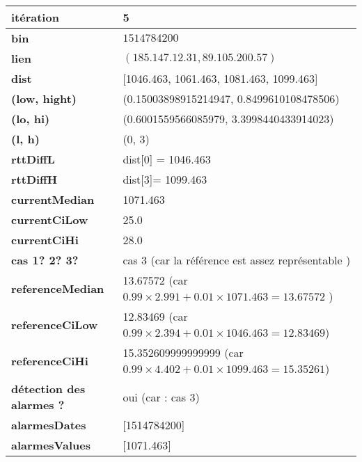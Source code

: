 	\begin{table}[H]
	\centering
	
	\begin{tabularx}{\linewidth}{|l|X| }
		\hline
		\textbf{itération} & 5	\\ \hline
		\textbf{bin} & $1514784200$ \\ \hline
		\textbf{lien} & $(185.147.12.31, 89.105.200.57)$  \\ \hline
		\textbf{dist}& [1046.463, 1061.463, 1081.463, 1099.463]	\\ \hline
		\textbf{(low, hight)}& (0.15003898915214947, 0.8499610108478506) 	\\ \hline
		\textbf{(lo, hi)}&(0.6001559566085979, 3.3998440433914023)  \\ \hline
		\textbf{(l, h)} & (0, 3) 	\\ \hline
		\textbf{rttDiffL}& dist[0] = 1046.463	\\ \hline
		\textbf{rttDiffH}& dist[3]= 1099.463	\\ \hline
		\textbf{currentMedian}& 1071.463	\\ \hline
		\textbf{currentCiLow}& 25.0 	\\ \hline
		\textbf{currentCiHi}& 28.0	\\ \hline
	\textbf{cas 1? 2? 3?}& cas 3 (car la référence est assez représentable )  \\ \hline
		\textbf{referenceMedian}& 13.67572 (car $ 0.99×2.991 + 0.01×1071.463 = 13.67572 $ ) 	\\ \hline
		\textbf{referenceCiLow}& 12.83469  (car $ 0.99×2.394+ 0.01×1046.463 = 12.83469  $)	\\ \hline
		\textbf{referenceCiHi}& 15.352609999999999 (car $ 0.99×4.402 + 0.01×1099.463 = 15.35261 $)	\\ \hline
		\textbf{détection des alarmes ?}& oui (car : cas 3)	\\ \hline
		\textbf{alarmesDates}& [1514784200]	\\ \hline
		\textbf{alarmesValues}& [1071.463]	\\ \hline
		
	\end{tabularx}
\end{table}



